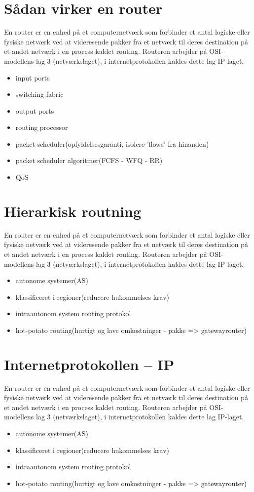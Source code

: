 \section{Sådan virker en router}
En router er en enhed på et computernetværk som forbinder et antal logiske eller fysiske netværk ved at videresende pakker fra et netværk til deres destination på et andet netværk i en process kaldet routing. Routeren arbejder på OSI-modellens lag 3 (netværkslaget), i internetprotokollen kaldes dette lag IP-laget.
\begin{itemize}
	\item input ports
	\item switching fabric
	\item output ports
	\item routing processor
	\item packet scheduler(opfyldelsesgaranti, isolere 'flows' fra hinanden)
	\item packet scheduler algoritmer(FCFS - WFQ - RR)
	\item QoS
\end{itemize}

\section{Hierarkisk routning}
En router er en enhed på et computernetværk som forbinder et antal logiske eller fysiske netværk ved at videresende pakker fra et netværk til deres destination på et andet netværk i en process kaldet routing. Routeren arbejder på OSI-modellens lag 3 (netværkslaget), i internetprotokollen kaldes dette lag IP-laget.
\begin{itemize}
	\item autonome systemer(AS)
	\item klassificeret i regioner(reducere hukommelses krav)
	\item intraautonom system routing protokol
	\item hot-potato routing(hurtigt og lave omkostninger - pakke => gatewayrouter)
\end{itemize}

\section{Internetprotokollen – IP}
En router er en enhed på et computernetværk som forbinder et antal logiske eller fysiske netværk ved at videresende pakker fra et netværk til deres destination på et andet netværk i en process kaldet routing. Routeren arbejder på OSI-modellens lag 3 (netværkslaget), i internetprotokollen kaldes dette lag IP-laget.
\begin{itemize}
	\item autonome systemer(AS)
	\item klassificeret i regioner(reducere hukommelses krav)
	\item intraautonom system routing protokol
	\item hot-potato routing(hurtigt og lave omkostninger - pakke => gatewayrouter)
\end{itemize}